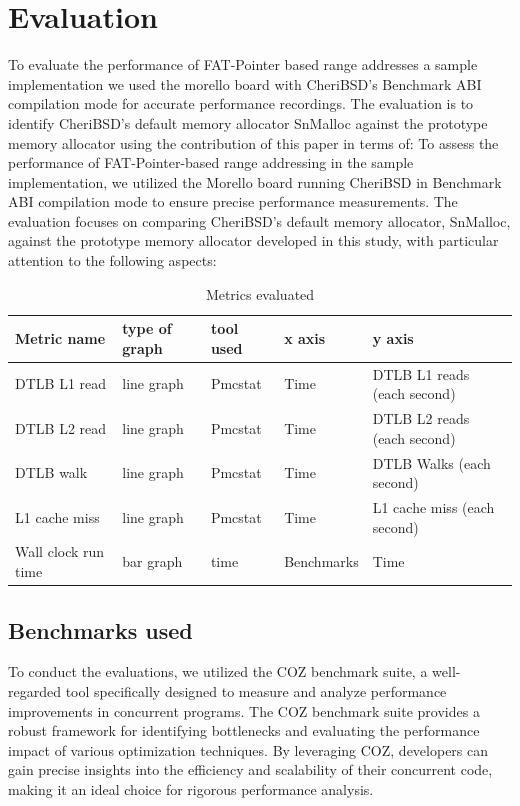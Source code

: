 \chapter{Evaluation}\label{chap:evaluation}
\ifpdf
    \graphicspath{{Evaluation/Figs/Raster/}{Evaluation/Figs/PDF/}{Evaluation/Figs/}}
\else
    \graphicspath{{Evaluation/Figs/Vector/}{Evaluation/Figs/}}
\fi

To evaluate the performance of FAT-Pointer based range addresses a sample implementation we used
the morello board with CheriBSD's Benchmark ABI\cite{noauthor_benchmark_nodate} compilation mode for accurate performance recordings. 
The evaluation is to identify CheriBSD's default memory allocator SnMalloc\cite{lietar_snmalloc_2019} against the prototype memory 
allocator using the contribution of this paper in terms of: 
To assess the performance of FAT-Pointer-based range addressing in the sample implementation, we utilized the 
Morello board running CheriBSD in Benchmark ABI compilation mode to ensure precise performance measurements. 
The evaluation focuses on comparing CheriBSD's default memory allocator, SnMalloc, against the prototype 
memory allocator developed in this study, with particular attention to the following aspects:

\begin{table}[!ht]
  \centering
  \begin{tabular}{|l|l|l|l|l|}
  \hline
      Metric name & type of graph & tool used & x axis & y axis \\ \hline
      DTLB L1 read & line graph & Pmcstat & Time & DTLB L1 reads (each second) \\ \hline
      DTLB L2 read & line graph & Pmcstat & Time & DTLB L2 reads (each second) \\ \hline
      DTLB walk & line graph & Pmcstat & Time & DTLB Walks (each second) \\ \hline
      L1 cache miss & line graph & Pmcstat & Time & L1 cache miss (each second) \\ \hline
      Wall clock run time & bar graph & time & Benchmarks & Time \\ \hline
  \end{tabular}
  \caption{Metrics evaluated}
\end{table}

\section{Benchmarks used}
To conduct the evaluations, we utilized the COZ\cite{curtsinger_coz_2015} benchmark suite, a well-regarded tool specifically designed 
to measure and analyze performance improvements in concurrent programs. The COZ benchmark suite provides a
robust framework for identifying bottlenecks and evaluating the performance impact of various optimization
techniques. By leveraging COZ, developers can gain precise insights into the efficiency and scalability of
their concurrent code, making it an ideal choice for rigorous performance analysis.

